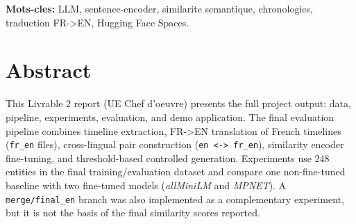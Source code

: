 \vspace{0.5cm}
\noindent\textbf{Mots-cles:} LLM, sentence-encoder, similarite semantique, chronologies, traduction FR->EN, Hugging Face Spaces.

\chapter*{Abstract}
This Livrable 2 report (UE Chef d'oeuvre) presents the full project output:
data, pipeline, experiments, evaluation, and demo application.
The final evaluation pipeline combines timeline extraction,
FR->EN translation of French timelines (\texttt{fr\_en} files),
cross-lingual pair construction (\texttt{en <-> fr\_en}),
similarity encoder fine-tuning, and threshold-based controlled generation.
Experiments use 248 entities in the final training/evaluation dataset and
compare one non-fine-tuned baseline with two fine-tuned models
(\textit{allMiniLM} and \textit{MPNET}).
A \texttt{merge/final\_en} branch was also implemented as a complementary
experiment, but it is not the basis of the final similarity scores reported.


